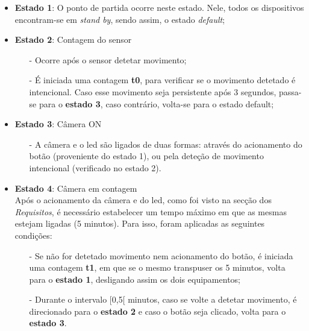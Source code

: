 \documentclass{article}
\begin{document}
\begin{itemize}
     \item \textbf{Estado 1}: O ponto de partida ocorre neste estado. Nele, todos os dispositivos encontram-se em \textit{stand by}, sendo assim, o estado \textit{default};
    
    \item \textbf{Estado 2}: Contagem do sensor
        \begin{itemize}
            \item[-] Ocorre após o sensor detetar movimento;
            \item[-] É iniciada uma contagem \textbf{t0}, para verificar se o movimento detetado é intencional. Caso esse movimento seja persistente após 3 segundos, passa-se para o \textbf{estado 3}, caso contrário, volta-se para o estado default;
        \end{itemize}
        
    \item \textbf{Estado 3}: Câmera ON
        \begin{itemize}
            \item[-] A câmera e o led são ligados de duas formas: através do acionamento do botão (proveniente do estado 1), ou pela deteção de movimento intencional (verificado no estado 2).
        \end{itemize}
        
    \item \textbf{Estado 4}: Câmera em contagem \\
    
        \hspace{0.5cm}Após o acionamento da câmera e do led, como foi visto na secção dos \textit{Requisitos},  é necessário estabelecer um tempo máximo em que as mesmas estejam ligadas (5 minutos). Para isso, foram aplicadas as seguintes condições:
        
        \begin{itemize}
            \item[-] Se não for detetado movimento nem acionamento do botão, é iniciada uma contagem \textbf{t1}, em que se o mesmo transpuser os 5 minutos, volta para o \textbf{estado 1}, desligando assim os dois equipamentos;
            \item[-] Durante o intervalo [0,5[ minutos, caso se volte a detetar movimento, é direcionado para o \textbf{estado 2} e caso o botão seja clicado, volta para o \textbf{estado 3}.
        \end{itemize}
    
    
\end{itemize}
\end{document}

